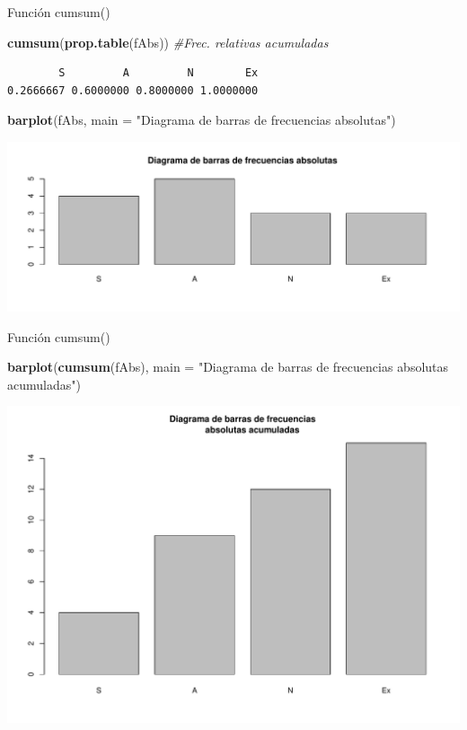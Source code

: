 \documentclass[
  ignorenonframetext,
]{beamer}
\newenvironment{Shaded}{\begin{snugshade}}{\end{snugshade}}
\newcommand{\AttributeTok}[1]{\textcolor[rgb]{0.13,0.29,0.53}{#1}}
\newcommand{\CommentTok}[1]{\textcolor[rgb]{0.56,0.35,0.01}{\textit{#1}}}
\newcommand{\FunctionTok}[1]{\textcolor[rgb]{0.13,0.29,0.53}{\textbf{#1}}}
\newcommand{\NormalTok}[1]{#1}
\newcommand{\StringTok}[1]{\textcolor[rgb]{0.31,0.60,0.02}{#1}}
\begin{document}
\begin{frame}[fragile]{Función cumsum()}
\label{funciuxf3n-cumsum-7}
\begin{Shaded}
\begin{Highlighting}[]
\FunctionTok{cumsum}\NormalTok{(}\FunctionTok{prop.table}\NormalTok{(fAbs)) }\CommentTok{\#Frec. relativas acumuladas}
\end{Highlighting}
\end{Shaded}

\begin{verbatim}
        S         A         N        Ex 
0.2666667 0.6000000 0.8000000 1.0000000 
\end{verbatim}

\begin{Shaded}
\begin{Highlighting}[]
\FunctionTok{barplot}\NormalTok{(fAbs, }
        \AttributeTok{main =} \StringTok{"Diagrama de barras de frecuencias absolutas"}\NormalTok{)}
\end{Highlighting}
\end{Shaded}

\includegraphics[width=0.8\linewidth]{R_base_files/figure-beamer/unnamed-chunk-139-1}
\end{frame}

\begin{frame}[fragile]{Función cumsum()}
\label{funciuxf3n-cumsum-8}
\begin{Shaded}
\begin{Highlighting}[]
\FunctionTok{barplot}\NormalTok{(}\FunctionTok{cumsum}\NormalTok{(fAbs), }
        \AttributeTok{main =} \StringTok{"Diagrama de barras de frecuencias}
\StringTok{        absolutas acumuladas"}\NormalTok{)}
\end{Highlighting}
\end{Shaded}

\includegraphics[width=0.5\linewidth]{R_base_files/figure-beamer/unnamed-chunk-140-1}
\end{frame}
\end{document}
